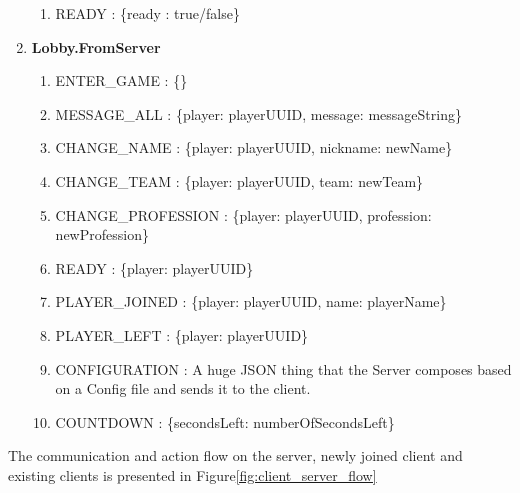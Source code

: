 \documentclass{article}
\begin{document}
\begin{enumerate}
\begin{enumerate}
	\item READY :
	\{ready : true/false\}    
     
  \end{enumerate}
  
  
  \item \textbf{Lobby.FromServer}
  
  \begin{enumerate}
    	\item ENTER\_GAME :
    	\{\}
		
		\item MESSAGE\_ALL :
		\{player: playerUUID, message: messageString\}
		
		\item CHANGE\_NAME :
		\{player: playerUUID, nickname: newName\}
		
		\item CHANGE\_TEAM :
		\{player: playerUUID, team: newTeam\}
				
		\item CHANGE\_PROFESSION :
		\{player: playerUUID, profession: newProfession\}
		
		\item READY :
		\{player: playerUUID\}
										
		\item PLAYER\_JOINED :
		\{player: playerUUID, name: playerName\}
		
		\item PLAYER\_LEFT :
		\{player: playerUUID\}
			
		\item CONFIGURATION :
		A huge JSON thing that the Server composes based on a Config file and sends it
		to the client. 
		
		\item COUNTDOWN :
		\{secondsLeft: numberOfSecondsLeft\}
		
  \end{enumerate}  
  
\end{enumerate}

The communication and action flow on the server, newly joined client and
existing clients is presented in Figure\ref{fig:client_server_flow}
\end{document}
